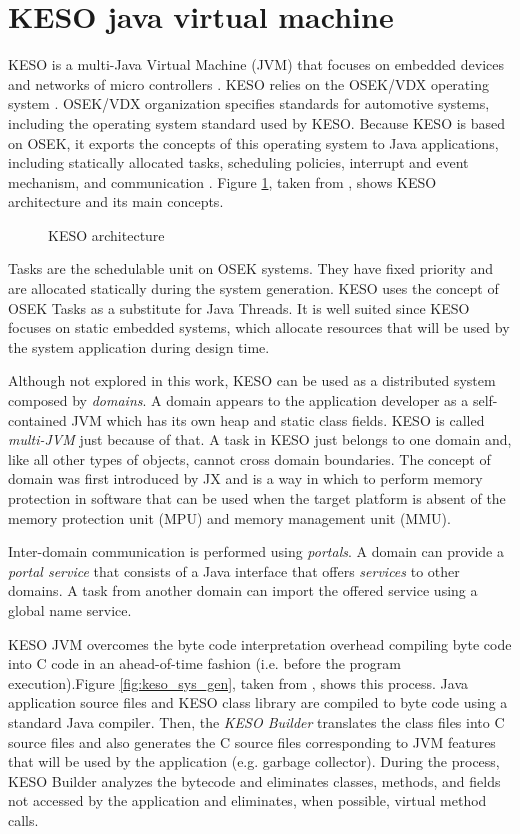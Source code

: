 \documentclass[12pt]{article} %
\newcommand{\fig}[4][htb]{
  \begin{figure}[#1] {\centering\scalebox{#2}{\texttt{[image: fig/\#3]}}\par}
    \caption{#4\label{fig:#3}}
  \end{figure}
}
\begin{document}
\section{KESO java virtual machine}
\label{sec:keso}
KESO is a multi-Java Virtual Machine (JVM) that focuses on embedded devices and 
networks of micro controllers \cite{Wawersich:2007}. KESO relies on the 
OSEK/VDX operating system \cite{osek-vdx_portal}. OSEK/VDX organization 
specifies standards for automotive systems, including the operating system 
standard used by KESO. Because KESO is based on OSEK, it exports the concepts 
of this operating system to Java applications, including statically allocated 
tasks, scheduling policies, interrupt and event mechanism, and communication
\cite{osek_spec223}. Figure \ref{fig:keso_architecture}, taken from 
\cite{Stilkerich:2006}, shows KESO architecture and its main concepts.

\fig{.5}{keso_architecture}{KESO architecture \cite{Stilkerich:2006}}

Tasks are the schedulable unit on OSEK systems. They have fixed priority and 
are allocated statically during the system generation. KESO uses the concept of
OSEK Tasks as a substitute for Java Threads. It is well suited since KESO
focuses on static embedded systems, which allocate resources that will be used
by the system application during design time.

Although not explored in this work, KESO can be used as a distributed system
composed by \emph{domains}. A domain appears to the application developer as
a self-contained JVM which has its own heap and static class fields. KESO is
called \emph{multi-JVM} just because of that. A task in KESO just belongs to
one domain and, like all other types of objects, cannot cross domain 
boundaries.
The concept of domain was first introduced by JX \cite{713870} and is a way in
which to perform memory protection in software that can be used when the target
platform is absent of the memory protection unit (MPU) and memory management 
unit (MMU).

Inter-domain communication is performed using \emph{portals}. A domain can
provide a \emph{portal service} that consists of a Java interface that offers
\emph{services} to other domains. A task from another domain can import the 
offered service using a global name service.

KESO JVM overcomes the byte code interpretation overhead compiling byte code into C code in an ahead-of-time fashion 
(i.e. before the program execution).Figure \ref{fig:keso_sys_gen}, taken from \cite{Wawersich:2007}, shows this process. Java application source files and KESO class library are compiled to byte code using a standard Java compiler. Then, the \emph{KESO Builder} translates the class files into C source files and also generates the C source files corresponding to JVM features that will be used by the application (e.g. garbage collector). During the process, KESO Builder analyzes the bytecode and eliminates classes, methods, and fields not accessed by the application and eliminates, when possible, virtual method calls.
\end{document}
